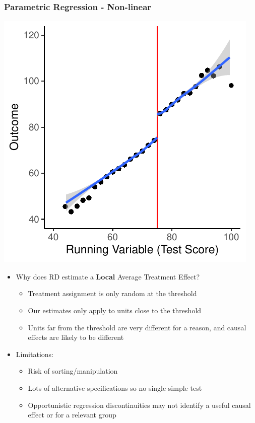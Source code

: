 \documentclass[xcolor=x11names,compress]{beamer}\usepackage[]{graphicx}\usepackage[]{xcolor}
\makeatletter
\def\maxwidth{ %
  \ifdim\Gin@nat@width>\linewidth
    \linewidth
  \else
    \Gin@nat@width
  \fi
}
\newenvironment{knitrout}{}{} %
\renewcommand{\(}{\begin{columns}}
\renewcommand{\)}{\end{columns}}
\newcommand{\<}[1]{\begin{column}{#1}}
\renewcommand{\>}{\end{column}}
\makeatother
\begin{document}
\begin{frame}
\frametitle{Parametric Regression - Non-linear}
\begin{center}
\begin{knitrout}
\color{fgcolor}
\includegraphics[width=\maxwidth]{figure/chart5-1} 
\end{knitrout}
\end{center}
\end{frame}

\begin{frame}
\begin{itemize}
\item Why does RD estimate a \textbf{Local} Average Treatment Effect?
\pause
\begin{itemize}
\item Treatment assignment is only random at the threshold
\pause
\item Our estimates only apply to units close to the threshold
\pause
\item Units far from the threshold are very different for a reason, and causal effects are likely to be different
\end{itemize}
\end{itemize}
\end{frame}


\begin{frame}
\begin{itemize}
\item Limitations:
\begin{itemize}
\item Risk of sorting/manipulation
\pause
\item Lots of alternative specifications so no single simple test
\pause
\item Opportunistic regression discontinuities may not identify a useful causal effect or for a relevant group
\pause
\end{itemize}
\end{itemize}
\end{frame}
\end{document}
